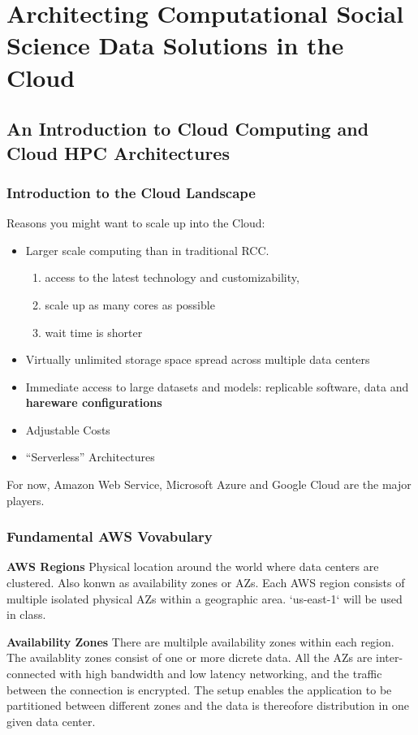 \documentclass{article}
\begin{document}
\section{Architecting Computational Social Science Data Solutions in the Cloud}
\subsection{An Introduction to Cloud Computing and Cloud HPC Architectures}

\subsubsection{Introduction to the Cloud Landscape}

Reasons you might want to scale up into the Cloud: 

\begin{itemize}
    \item Larger scale computing than in traditional RCC.
    \begin{enumerate}
        \item access to the latest technology and customizability,  
        \item scale up as many cores as possible
        \item wait time is shorter
    \end{enumerate}
    \item Virtually unlimited storage space spread across multiple data centers
    \item Immediate access to large datasets and models: replicable software, data and \textbf{hareware configurations}
    \item Adjustable Costs
    \item ``Serverless'' Architectures
\end{itemize}

For now, Amazon Web Service, Microsoft Azure and Google Cloud are the major players.

\subsubsection{Fundamental AWS Vovabulary}

\textbf{AWS Regions} Physical location around the world where data centers are clustered. Also konwn as availability zones or AZs. Each AWS region consists of multiple isolated physical AZs within a geographic area. `us-east-1` will be used in class.

\textbf{Availability Zones} There are multilple availability zones within each region. The availablity zones consist of one or more dicrete data. All the AZs are inter-connected with high bandwidth and low latency networking, and the traffic between the connection is encrypted. The setup enables the application to be partitioned between different zones and the data is thereofore distribution in one given data center.
\end{document}
